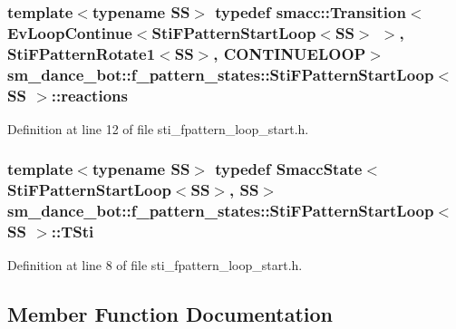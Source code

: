 \subsubsection[{\texorpdfstring{reactions}{reactions}}]{\setlength{\rightskip}{0pt plus 5cm}template$<$typename SS$>$ typedef {\bf smacc\+::\+Transition}$<$Ev\+Loop\+Continue$<${\bf Sti\+F\+Pattern\+Start\+Loop}$<$SS$>$ $>$, {\bf Sti\+F\+Pattern\+Rotate1}$<$SS$>$, C\+O\+N\+T\+I\+N\+U\+E\+L\+O\+OP$>$ {\bf sm\+\_\+dance\+\_\+bot\+::f\+\_\+pattern\+\_\+states\+::\+Sti\+F\+Pattern\+Start\+Loop}$<$ SS $>$\+::{\bf reactions}}\hypertarget{structsm__dance__bot_1_1f__pattern__states_1_1StiFPatternStartLoop_a90229e6dfa09f3f177f633072a9af069}{}\label{structsm__dance__bot_1_1f__pattern__states_1_1StiFPatternStartLoop_a90229e6dfa09f3f177f633072a9af069}


Definition at line 12 of file sti\+\_\+fpattern\+\_\+loop\+\_\+start.\+h.

\subsubsection[{\texorpdfstring{T\+Sti}{TSti}}]{\setlength{\rightskip}{0pt plus 5cm}template$<$typename SS$>$ typedef {\bf Smacc\+State}$<${\bf Sti\+F\+Pattern\+Start\+Loop}$<$SS$>$, SS$>$ {\bf sm\+\_\+dance\+\_\+bot\+::f\+\_\+pattern\+\_\+states\+::\+Sti\+F\+Pattern\+Start\+Loop}$<$ SS $>$\+::{\bf T\+Sti}}\hypertarget{structsm__dance__bot_1_1f__pattern__states_1_1StiFPatternStartLoop_a18f1bcdd4f45d9230c9b23b6153ae9e2}{}\label{structsm__dance__bot_1_1f__pattern__states_1_1StiFPatternStartLoop_a18f1bcdd4f45d9230c9b23b6153ae9e2}


Definition at line 8 of file sti\+\_\+fpattern\+\_\+loop\+\_\+start.\+h.



\subsection{Member Function Documentation}
